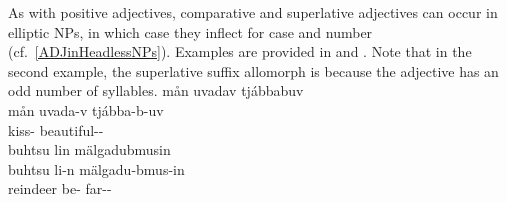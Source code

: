 As with positive adjectives, comparative and superlative adjectives can occur in elliptic NPs, in which case they inflect for case and number (cf.~\SEC\ref{ADJinHeadlessNPs}). Examples are provided in  and . Note that in the second example, the superlative suffix allomorph is  because the adjective has an odd number of syllables.
\ea\label{compATTRADJex2}%
\glll	mån uvadav tjábbabuv\\
	mån uvada-v tjábba-b-uv\\
	 kiss- beautiful--\\\nopagebreak
{}	
\z
\ea\label{superlATTRADJex2}
\glll	buhtsu lin mälgadubmusin\\
	buhtsu li-n mälgadu-bmus-in\\
	reindeer\BS{} be- far--\\\nopagebreak
{}	%
\z



